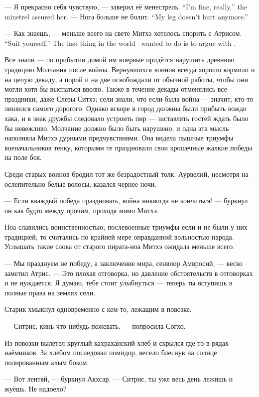 {--- Я прекрасно себя чувствую, --- заверил её менестрель.}
{``I'm fine, really,'' the minstrel assured her.}
{--- Нога больше не болит.}
{``My leg doesn't hurt anymore.''}

{--- Как знаешь, --- меньше всего на свете Митхэ хотелось спорить с Атрисом.}
{``Suit yourself.'' The last thing in the world \Mitchoe\ wanted to do is to argue with \Aatris.}

Все знали --- по прибытии домой им впервые придётся нарушить древнюю традицию Молчания после войны.
Вернувшихся воинов всегда хорошо кормили и на целую декаду, а порой и на две освобождали от обычной работы, чтобы они могли хотя бы выспаться вволю.
Также в течение декады отменялись все праздники, даже Слёзы Ситхэ;
сели знали, что если была война --- значит, кто-то лишился самого дорогого.
Однако вскоре в город должны были прибыть вожди хака, и в знак дружбы следовало устроить пир --- заставлять гостей ждать было бы невежливо.
Молчание должно было быть нарушено, и одна эта мысль наполняла Митхэ дурными предчувствиями.
Она видела пышные триумфы военачальников тенку, которыми те праздновали свои крошечные жалкие победы на поле боя.

Среди старых воинов бродил тот же безрадостный толк.
Аурвелий, несмотря на ослепительно белые волосы, казался чернее ночи.

--- Если кваждый победа праздновать, война никвогда не кончиться! --- буркнул он как будто между прочим, проходя мимо Митхэ.

Ноа славились воинственностью;
послевоенные триумфы если и не были у них традицией, то считались по крайней мере оправданной вольностью народа.
Услышать такие слова от старого пирата-ноа Митхэ ожидала меньше всего.

--- Мы празднуем не победу, а заключение мира, сенвиор Амвросий, --- веско заметил Атрис.
--- Это плохая отговорка, но давление обстоятельств в отговорках и не нуждается.
Я думаю, тебе стоит улыбнуться --- теперь ты вступишь в полные права на землях сели.

Старик хмыкнул одновременно с кем-то, лежащим в повозке.

--- Ситрис, кинь что-нибудь пожевать, --- попросила Согхо.

Из повозки вылетел круглый кахраханский хлеб и скрылся где-то в рядах наёмников.
За хлебом последовал помидор, весело блеснув на солнце полированным алым боком.

--- Вот лентяй, --- буркнул Акхсар.
--- Ситрис, ты уже весь день лежишь и жуёшь.
Не надоело?

